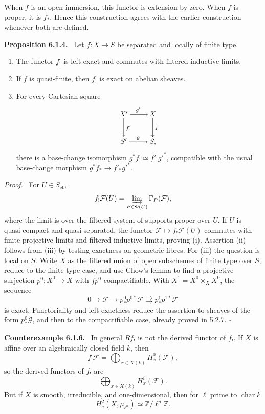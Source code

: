 \documentclass[12pt]{article}
\newcommand{\Ff}{\mathcal F}
\newcommand{\Gg}{\mathcal G}
\newcommand{\Zz}{\mathbb Z}
\newcommand{\et}{\mathrm{\acute et}}
\newcommand{\qedtext}{\hfill\(\square\)}
\newenvironment{statement}[1]{\par\medskip\noindent\textbf{#1.}\ }{\par\medskip}
\newenvironment{remarktext}[1]{\par\medskip\noindent\textbf{#1.}\ }{\par\medskip}
\newenvironment{prooftext}[1][Proof]{\par\noindent\emph{#1.}\ }{\par\medskip}
\begin{document}
When \(f\) is an open immersion, this functor is extension by zero. When \(f\) is proper, it is \(f_*\). Hence this construction agrees with the earlier construction whenever both are defined.

\begin{statement}{Proposition 6.1.4}
Let \(f:X\to S\) be separated and locally of finite type.
\begin{enumerate}[label=(\roman*)]
\item The functor \(f_!\) is left exact and commutes with filtered inductive limits.
\item If \(f\) is quasi-finite, then \(f_!\) is exact on abelian sheaves.
\item For every Cartesian square
\[
\xymatrix{X'\ar[r]^{g'}\ar[d]^{f'}&X\ar[d]^f\\S'\ar[r]^g&S,}
\]
there is a base-change isomorphism \(g^*f_!\simeq f'_!g'^*\), compatible with the usual base-change morphism \(g^*f_*\to f'_*g'^*\).
\end{enumerate}
\end{statement}

\begin{prooftext}
For \(U\in S_{\et}\),
\[
f_!\Ff(U)=\varinjlim_{P\in\Phi(U)}\Gamma_P(\Ff),
\]
where the limit is over the filtered system of supports proper over \(U\). If \(U\) is quasi-compact and quasi-separated, the functor \(\Ff\mapsto f_!\Ff(U)\) commutes with finite projective limits and filtered inductive limits, proving (i). Assertion (ii) follows from (iii) by testing exactness on geometric fibres. For (iii) the question is local on \(S\). Write \(X\) as the filtered union of open subschemes of finite type over \(S\), reduce to the finite-type case, and use Chow's lemma to find a projective surjection \(p^0:X^0\to X\) with \(fp^0\) compactifiable. With \(X^1=X^0\times_XX^0\), the sequence
\[
0\to \Ff\to p^0_*p^{0*}\Ff\rightrightarrows p^1_*p^{1*}\Ff
\]
is exact. Functoriality and left exactness reduce the assertion to sheaves of the form \(p^0_*\Gg\), and then to the compactifiable case, already proved in 5.2.7. \qedtext
\end{prooftext}

\begin{remarktext}{Counterexample 6.1.6}
In general \(Rf_!\) is not the derived functor of \(f_!\). If \(X\) is affine over an algebraically closed field \(k\), then
\[
f_!\Ff=\bigoplus_{x\in X(k)}H^0_x(\Ff),
\]
so the derived functors of \(f_!\) are
\[
\bigoplus_{x\in X(k)}H^i_x(\Ff).
\]
But if \(X\) is smooth, irreducible, and one-dimensional, then for \(\ell\) prime to \(\operatorname{char}k\)
\[
H^2_c(X,\mu_{\ell^n})\simeq\Zz/\ell^n\Zz.
\]
\end{remarktext}
\end{document}
